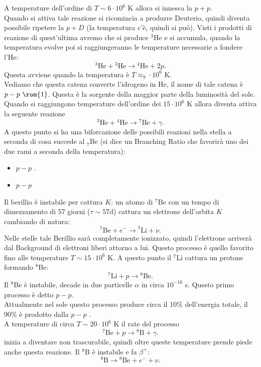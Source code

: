 A temperature dell'ordine di $T\sim 6\cdot 10^6$ K allora si innesca la $p+p$. \\
Quando si attiva tale reazione si ricomincia a produrre Deuterio, quindi diventa possibile ripetere la $p+D$ (la temperatura c'è, quindi si può). Visti i prodotti di reazione di quest'ultima avremo che si produce ${}^3$He e si accumula, quando la temperatura evolve poi si raggiungeranno le temperature necessarie a fondere l'He:
\[
    {}^3\text{He}+{}^3\text{He}\to {}^4\text{He}+2p
.\] 
Questa avviene quando la temperatura è $T\approx_8\cdot 10^6$ K.\\
Vediamo che questa catena converte l'idrogeno in He, il nome di tale catena è $p-p \text{ \rom{1}}$. Questa è la sorgente della maggior parte della luminosità del sole.\\
Quando si raggiungono temperature dell'ordine dei $15\cdot 10^6$ K allora diventa attiva la seguente reazione
\[
    {}^3\text{He} + {}^4\text{He}\to {}^7\text{Be}+\gamma
.\] 
A questo punto si ha una biforcazione delle possibili reazioni nella stella a seconda di cosa succede al ${}_7$Be (si dice un Branching Ratio che favorirà uno dei due rami a seconda della temperatura):
\begin{itemize}
    \item $p-p$ .
    \item $p-p$ 
\end{itemize}
Il berillio è instabile per cattura $K$: un atomo di ${}^7$Be con un tempo di dimezzamento di 57 giorni ($\tau\sim 57$d) cattura un elettrone dell'orbita $K$ cambiando di natura:
\[
    {}^7\text{Be}+e^-\to {}^7\text{Li}+\nu
.\] 
Nelle stelle tale Berillio sarà completamente ionizzato, quindi l'elettrone arriverà dal Background di elettroni liberi attorno a lui. Questo processo è quello favorito fino alle temperature $T\sim 15 \cdot 10^6$ K. A questo punto il ${}^7$Li cattura un protone formando ${}^8$Be:
\[
    {}^7\text{Li}+p\to {}^8\text{Be}
.\] 
Il ${}^8$Be è instabile, decade in due particelle $\alpha$ in circa $10^{-16}$ s. Questo primo processo è detto $p-p$.\\
Attualmente nel sole questo processo produce circa il 10\% dell'energia totale, il 90\% è prodotto dalla $p-p$ .\\
A temperature di circa $T\sim 20\cdot 10^6$ K il rate del processo 
\[
    {}^7\text{Be}+p\to {}^8\text{B}+\gamma
.\] 
inizia a diventare non trascurabile, quindi oltre queste temperature prende piede anche questa reazione. Il ${}^8$B è instabile e fa $\beta^+$:
\[
    {}^8\text{B}\to {}^8\text{Be}+e^-+\nu
.\] 
